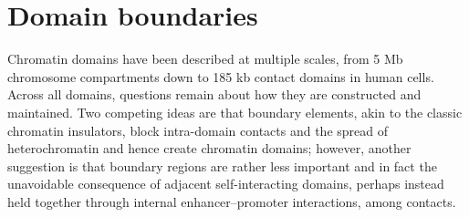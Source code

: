 \documentclass[a4paper,11pt,oneside]{book}
\begin{document}



\section{Domain boundaries}


Chromatin domains have been described at multiple scales, from 5 Mb chromosome compartments\cite{Lieberman2009} down to 185 kb contact domains\cite{Rao2014} in human cells. Across all domains, questions remain about how they are constructed and maintained. Two competing ideas are that boundary elements, akin to the classic chromatin insulators, block intra-domain contacts and the spread of heterochromatin and hence create chromatin domains; however, another suggestion is that boundary regions are rather less important and in fact the unavoidable consequence of adjacent self-interacting domains, perhaps instead held together through internal enhancer--promoter interactions, among contacts.  
\end{document}
